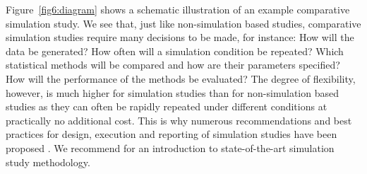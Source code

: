 Figure~\ref{fig6:diagram} shows a schematic illustration of an example
comparative simulation study. We see that, just like non-simulation based
studies, comparative simulation studies require many decisions to be made, for
instance: How will the data be generated? How often will a simulation condition
be repeated? Which statistical methods will be compared and how are their
parameters specified? How will the performance of the methods be evaluated? The
degree of flexibility, however, is much higher for simulation studies than for
non-simulation based studies as they can often be rapidly repeated under
different conditions at practically no additional cost. This is why numerous
recommendations and best practices for design, execution and reporting of
simulation studies have been proposed \citep{Hoaglin1975, Holford2000,
  Burton2006, Smith2010, OKelly2016, Monks2018, Elofsson2019, Morris2019,
  Boulesteix2020B}. We recommend \citet{Morris2019} for an introduction to
state-of-the-art simulation study methodology.

